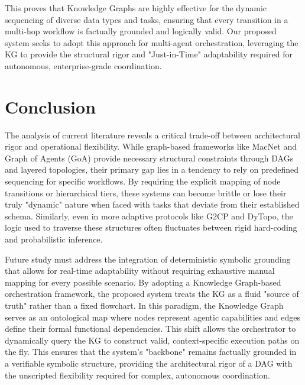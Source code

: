 This proves that Knowledge Graphs are highly effective for the dynamic sequencing of diverse data types and tasks, ensuring that every transition in a multi-hop workflow is factually grounded and logically valid. Our proposed system seeks to adopt this approach for multi-agent orchestration, leveraging the KG to provide the structural rigor and "Just-in-Time" adaptability required for autonomous, enterprise-grade coordination.

\section{Conclusion}
The analysis of current literature reveals a critical trade-off between architectural rigor and operational flexibility. While graph-based frameworks like MacNet and Graph of Agents (GoA) provide necessary structural constraints through DAGs and layered topologies, their primary gap lies in a tendency to rely on predefined sequencing for specific workflows. By requiring the explicit mapping of node transitions or hierarchical tiers, these systems can become brittle or lose their truly "dynamic" nature when faced with tasks that deviate from their established schema. Similarly, even in more adaptive protocols like G2CP and DyTopo, the logic used to traverse these structures often fluctuates between rigid hard-coding and probabilistic inference.

Future study must address the integration of deterministic symbolic grounding that allows for real-time adaptability without requiring exhaustive manual mapping for every possible scenario. By adopting a Knowledge Graph-based orchestration framework, the proposed system treats the KG as a fluid "source of truth" rather than a fixed flowchart. In this paradigm, the Knowledge Graph serves as an ontological map where nodes represent agentic capabilities and edges define their formal functional dependencies. 
This shift allows the orchestrator to dynamically query the KG to construct valid, context-specific execution paths on the fly. This ensures that the system's "backbone" remains factually grounded in a verifiable symbolic structure, providing the architectural rigor of a DAG with the unscripted flexibility required for complex, autonomous coordination.


